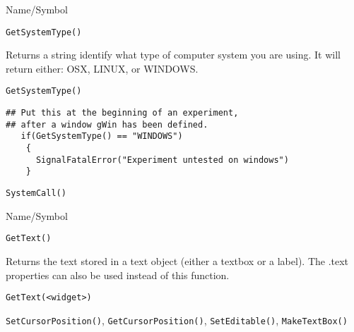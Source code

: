\begin{desc}{Name/Symbol}
\item[Name/Symbol]	\verb+GetSystemType()+

\item[Description]	Returns a string identify what type of computer system you are using. It will return either: OSX, LINUX, or WINDOWS.

\item[Usage]
\begin{verbatim}
GetSystemType()
\end{verbatim}

\item[Example]

\begin{verbatim}
## Put this at the beginning of an experiment, 
## after a window gWin has been defined.
   if(GetSystemType() == "WINDOWS")
    {
      SignalFatalError("Experiment untested on windows")
    }

\end{verbatim}

\item[See Also]
  \verb+SystemCall()+
\end{desc}



\begin{desc}{Name/Symbol}
\item[Name/Symbol]	\verb+GetText()+

\item[Description]	Returns the text stored in a text object 
		(either a textbox or a label).  The .text properties can also
  be used instead of this function.

\item[Usage]
\begin{verbatim}
GetText(<widget>)
\end{verbatim}

\item[Example]	

\item[See Also]	\verb+SetCursorPosition()+, \verb+GetCursorPosition()+, \verb+SetEditable()+, \verb+MakeTextBox()+
\end{desc}


